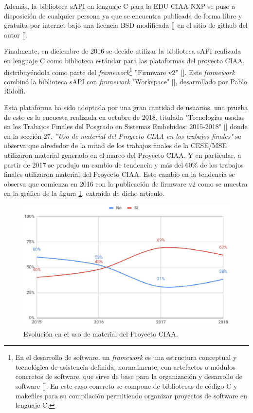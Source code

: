 Además, la biblioteca sAPI en lenguaje C para la EDU-CIAA-NXP se puso a disposición de cualquier persona ya que se encuentra publicada de forma libre y gratuita por internet bajo una licencia BSD modificada [] en el sitio de github del autor [].

Finalmente, en diciembre de 2016 se decide utilizar la biblioteca sAPI realizada en lenguaje C como biblioteca estándar para las plataformas del proyecto CIAA, distribuyéndola como parte del \emph{framework}\footnote{En el desarrollo de software, un \emph{framework} es una estructura conceptual y tecnológica de asistencia definida, normalmente, con artefactos o módulos concretos de software, que sirve de base para la organización y desarrollo de software []. En este caso concreto se compone de bibliotecas de código C y makefiles para su compilación permitiendo organizar proyectos de software en lenguaje C.} ''Firmware v2'' []. Este \emph{framework} combinó la biblioteca sAPI con \emph{framework} "Workspace" [], desarrollado por Pablo Ridolfi.

Esta plataforma ha sido adoptada por una gran cantidad de usuarios, una prueba de esto es la encuesta realizada en octubre de 2018, titulada "Tecnologías usadas en los Trabajos Finales del Posgrado en Sistemas Embebidos: 2015-2018" [] donde en la sección 27, \emph{''Uso de material del Proyecto CIAA en los trabajos finales"} se observa que alrededor de la mitad de los trabajos finales de la CESE/MSE utilizaron material generado en el marco del Proyecto CIAA. Y en particular, a partir de 2017 se produjo un cambio de tendencia y más del 60\% de los trabajos finales utilizaron material del Proyecto CIAA. Este cambio en la tendencia se observa que comienza en 2016 con la publicación de firmware v2 como se muestra en la gráfica de la figura \ref{fig:tendenciaMaterialCiaa}, extraída de dicho artículo.

\begin{figure}[!htbp]
\begin{center}  %
\includegraphics*[width=12cm]{Figures/TendenciaMaterialCiaa.png}
\par\caption{Evolución en el uso de material del Proyecto CIAA.}\label{fig:tendenciaMaterialCiaa}
\end{center}
\end{figure}

